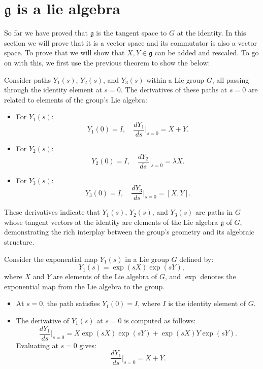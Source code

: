 \documentclass{article}
\begin{document}
\section{\(\mathfrak{g} \) is a lie algebra }
So far we have proved that \( \mathfrak{g} \) is the tangent space to \( G \) at the identity. In this section we will prove that it is a vector space and its commutator is also a vector space. To prove that we will show that \( X,Y \in \mathfrak{g} \) can be added and rescaled. To go on with this, we first use the previous theorem to show the below: 

Consider paths \(Y_1(s)\), \(Y_2(s)\), and \(Y_3(s)\) within a Lie group \(G\), all passing through the identity element at \(s=0\). The derivatives of these paths at \(s=0\) are related to elements of the group's Lie algebra:

\begin{itemize}
    \item For \(Y_1(s)\):
    \[
    Y_1(0) = I, \quad \frac{dY_1}{ds}\bigg|_{s=0} = X+Y.
    \]
    
    \item For \(Y_2(s)\):
    \[
    Y_2(0) = I, \quad \frac{dY_2}{ds}\bigg|_{s=0} = \lambda X.
    \]
    
    \item For \(Y_3(s)\):
    \[
    Y_3(0) = I, \quad \frac{dY_3}{ds}\bigg|_{s=0} = [X, Y].
    \]
\end{itemize}

These derivatives indicate that \(Y_1(s)\), \(Y_2(s)\), and \(Y_3(s)\) are paths in \(G\) whose tangent vectors at the identity are elements of the Lie algebra \(\mathfrak{g}\) of \(G\), demonstrating the rich interplay between the group's geometry and its algebraic structure.

Consider the exponential map \( Y_1(s) \) in a Lie group \( G \) defined by:
\[
Y_1(s) = \exp(sX) \exp(sY),
\]
where \( X \) and \( Y \) are elements of the Lie algebra of \( G \), and \(\exp\) denotes the exponential map from the Lie algebra to the group.

\begin{itemize}
    \item At \( s = 0 \), the path satisfies \( Y_1(0) = I \), where \( I \) is the identity element of \( G \).
    \item The derivative of \( Y_1(s) \) at \( s = 0 \) is computed as follows:
    \[
    \frac{dY_1}{ds}\bigg|_{s=0} = X\exp(sX)\exp(sY) + \exp(sX)Y\exp(sY).
    \]
    Evaluating at \( s = 0 \) gives:
    \[
    \frac{dY_1}{ds}\bigg|_{s=0} = X + Y.
    \]
\end{itemize} 
\end{document}
